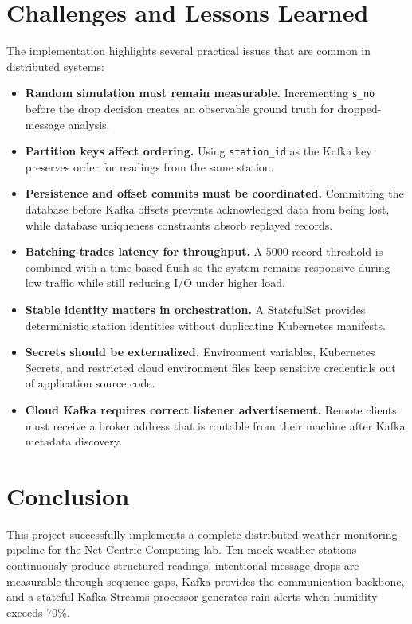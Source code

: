 \documentclass[12pt,a4paper]{article}
\begin{document}
\section{Challenges and Lessons Learned}
The implementation highlights several practical issues that are common in distributed systems:
\begin{itemize}
    \item \textbf{Random simulation must remain measurable.} Incrementing \texttt{s\_no} before the drop decision creates an observable ground truth for dropped-message analysis.
    \item \textbf{Partition keys affect ordering.} Using \texttt{station\_id} as the Kafka key preserves order for readings from the same station.
    \item \textbf{Persistence and offset commits must be coordinated.} Committing the database before Kafka offsets prevents acknowledged data from being lost, while database uniqueness constraints absorb replayed records.
    \item \textbf{Batching trades latency for throughput.} A 5000-record threshold is combined with a time-based flush so the system remains responsive during low traffic while still reducing I/O under higher load.
    \item \textbf{Stable identity matters in orchestration.} A StatefulSet provides deterministic station identities without duplicating Kubernetes manifests.
    \item \textbf{Secrets should be externalized.} Environment variables, Kubernetes Secrets, and restricted cloud environment files keep sensitive credentials out of application source code.
    \item \textbf{Cloud Kafka requires correct listener advertisement.} Remote clients must receive a broker address that is routable from their machine after Kafka metadata discovery.
\end{itemize}

\section{Conclusion}
This project successfully implements a complete distributed weather monitoring pipeline for the Net Centric Computing lab. Ten mock weather stations continuously produce structured readings, intentional message drops are measurable through sequence gaps, Kafka provides the communication backbone, and a stateful Kafka Streams processor generates rain alerts when humidity exceeds 70\%.
\end{document}
